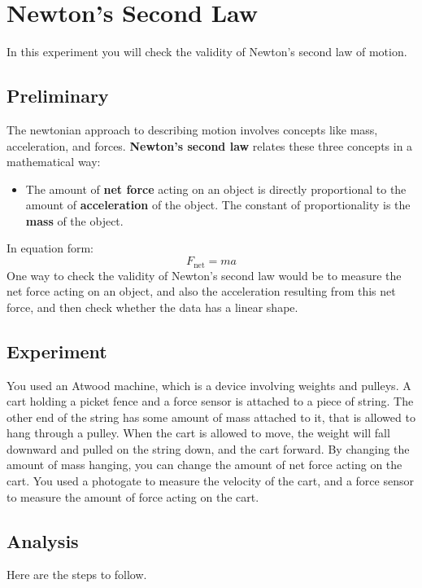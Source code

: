 \setcounter{chapter}{3}
\chapter{Newton's Second Law}
%
In this experiment you will check the validity of Newton's second law of motion.
%
\section{Preliminary}
%
The newtonian approach to describing motion involves concepts like mass, acceleration, and forces. \textbf{Newton's second law} relates these three concepts in a mathematical way:
\begin{itemize}
    \item The amount of \textbf{net force} acting on an object is directly proportional to the amount of \textbf{acceleration} of the object. The constant of proportionality is the \textbf{mass} of the object.
\end{itemize}
In equation form:
\begin{equation}
    F_{\text{net}} = m a
    \label{eq:04.Fma}
\end{equation}
One way to check the validity of Newton's second law would be to measure the net force acting on an object, and also the acceleration resulting from this net force, and then check whether the data has a linear shape.
%
\section{Experiment}
%
You used an Atwood machine, which is a device involving weights and pulleys. A cart holding a picket fence and a force sensor is attached to a piece of string. The other end of the string has some amount of mass attached to it, that is allowed to hang through a pulley. When the cart is allowed to move, the weight will fall downward and pulled on the string down, and the cart forward. By changing the amount of mass hanging, you can change the amount of net force acting on the cart. You used a photogate to measure the velocity of the cart, and a force sensor to measure the amount of force acting on the cart.
%
\section{Analysis}
%
Here are the steps to follow.
%

